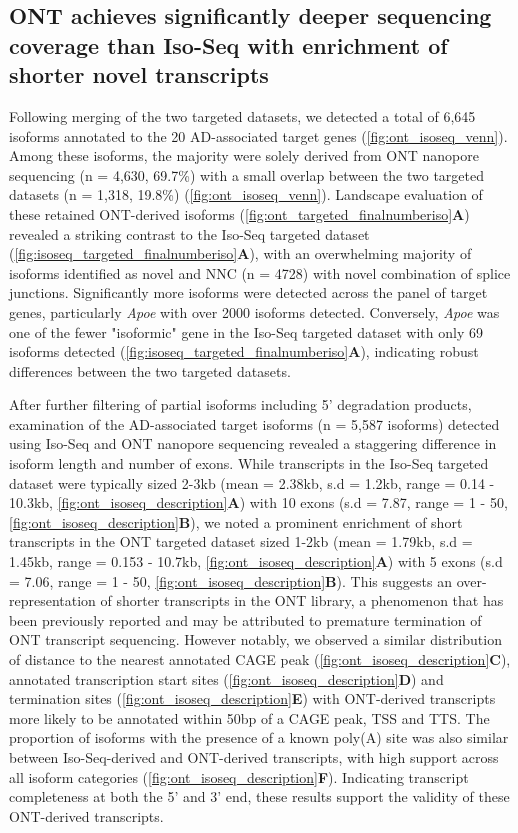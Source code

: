 \newpage
\subsection{ONT achieves significantly deeper sequencing coverage than Iso-Seq with enrichment of shorter novel transcripts}

Following merging of the two targeted datasets, we detected a total of 6,645 isoforms annotated to the 20 AD-associated target genes (\cref{fig:ont_isoseq_venn}). Among these isoforms, the majority were solely derived from ONT nanopore sequencing (n = 4,630, 69.7\%) with a small overlap between the two targeted datasets (n = 1,318, 19.8\%) (\cref{fig:ont_isoseq_venn}). Landscape evaluation of these retained ONT-derived isoforms (\cref{fig:ont_targeted_finalnumberiso}\textbf{A}) revealed a striking contrast to the Iso-Seq targeted dataset (\cref{fig:isoseq_targeted_finalnumberiso}\textbf{A}), with an overwhelming majority of isoforms identified as novel and NNC (n = 4728) with novel combination of splice junctions. Significantly more isoforms were detected across the panel of target genes, particularly \textit{Apoe} with over 2000 isoforms detected. Conversely, \textit{Apoe} was one of the fewer "isoformic" gene in the Iso-Seq targeted dataset with only 69 isoforms detected (\cref{fig:isoseq_targeted_finalnumberiso}\textbf{A}), indicating robust differences between the two targeted datasets.

After further filtering of partial isoforms including 5' degradation products, examination of the AD-associated target isoforms (n = 5,587 isoforms) detected using Iso-Seq and ONT nanopore sequencing revealed a staggering difference in isoform length and number of exons. While transcripts in the Iso-Seq targeted dataset were typically sized 2-3kb (mean = 2.38kb, s.d = 1.2kb, range = 0.14 - 10.3kb, \cref{fig:ont_isoseq_description}\textbf{A}) with 10 exons (s.d = 7.87, range = 1 - 50, \cref{fig:ont_isoseq_description}\textbf{B}), we noted a prominent enrichment of short transcripts in the ONT targeted dataset sized 1-2kb (mean = 1.79kb, s.d = 1.45kb, range = 0.153 - 10.7kb, \cref{fig:ont_isoseq_description}\textbf{A}) with 5 exons (s.d = 7.06, range = 1 - 50, \cref{fig:ont_isoseq_description}\textbf{B}). This suggests an over-representation of shorter transcripts in the ONT library, a phenomenon that has been previously reported and may be attributed to premature termination of ONT transcript sequencing. However notably, we observed a similar distribution of distance to the nearest annotated CAGE peak (\cref{fig:ont_isoseq_description}\textbf{C}), annotated transcription start sites (\cref{fig:ont_isoseq_description}\textbf{D}) and termination sites (\cref{fig:ont_isoseq_description}\textbf{E}) with ONT-derived transcripts more likely to be annotated within 50bp of a CAGE peak, TSS and TTS. The proportion of isoforms with the presence of a known poly(A) site was also similar between Iso-Seq-derived and ONT-derived transcripts, with high support across all isoform categories (\cref{fig:ont_isoseq_description}\textbf{F}). Indicating transcript completeness at both the 5' and 3' end, these results support the validity of these ONT-derived transcripts. 

